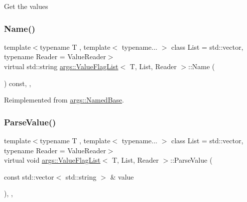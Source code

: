 Get the values \mbox{\label{classargs_1_1_value_flag_list_ac0188f5bbc605c02edce2a91675d423c}} 
\subsubsection{\texorpdfstring{Name()}{Name()}}
{\footnotesize\ttfamily template$<$typename T , template$<$ typename... $>$ class List = std\+::vector, typename Reader  = Value\+Reader$>$ \\
virtual std\+::string \hyperlink{classargs_1_1_value_flag_list}{args\+::\+Value\+Flag\+List}$<$ T, List, Reader $>$\+::Name (\begin{DoxyParamCaption}{ }\end{DoxyParamCaption}) const\hspace{0.3cm}{\ttfamily [inline]}, {\ttfamily [override]}, {\ttfamily [virtual]}}



Reimplemented from \hyperlink{classargs_1_1_named_base_a7e7bab5c0de59e717b87935b14376dfc}{args\+::\+Named\+Base}.

\mbox{\label{classargs_1_1_value_flag_list_afbd3d460a8cee4c84d0a6210de068f83}} 
\subsubsection{\texorpdfstring{Parse\+Value()}{ParseValue()}}
{\footnotesize\ttfamily template$<$typename T , template$<$ typename... $>$ class List = std\+::vector, typename Reader  = Value\+Reader$>$ \\
virtual void \hyperlink{classargs_1_1_value_flag_list}{args\+::\+Value\+Flag\+List}$<$ T, List, Reader $>$\+::Parse\+Value (\begin{DoxyParamCaption}\item[{const std\+::vector$<$ std\+::string $>$ \&}]{value }\end{DoxyParamCaption})\hspace{0.3cm}{\ttfamily [inline]}, {\ttfamily [override]}, {\ttfamily [virtual]}}

